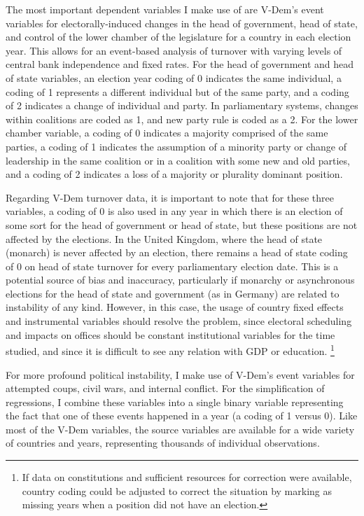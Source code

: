 \documentclass{article}
\begin{document}
    The most important dependent variables I make use of are V-Dem’s event variables for electorally-induced changes in the head of government, head of state, and control of the lower chamber of the legislature for a country in each election year. This allows for an event-based analysis of turnover with varying levels of central bank independence and fixed rates. For the head of government and head of state variables, an election year coding of 0 indicates the same individual, a coding of 1 represents a different individual but of the same party, and a coding of 2 indicates a change of individual and party. In parliamentary systems, changes within coalitions are coded as 1, and new party rule is coded as a 2. For the lower chamber variable, a coding of 0 indicates a majority comprised of the same parties, a coding of 1 indicates the assumption of a minority party or change of leadership in the same coalition or in a coalition with some new and old parties, and a coding of 2 indicates a loss of a majority or plurality dominant position.
    
    Regarding V-Dem turnover data, it is important to note that for these three variables, a coding of 0 is also used in any year in which there is an election of some sort for the head of government or head of state, but these positions are not affected by the elections. In the United Kingdom, where the head of state (monarch) is never affected by an election, there remains a head of state coding of 0 on head of state turnover for every parliamentary election date. This is a potential source of bias and inaccuracy, particularly if monarchy or asynchronous elections for the head of state and government (as in Germany) are related to instability of any kind. However, in this case, the usage of country fixed effects and instrumental variables should resolve the problem, since electoral scheduling and impacts on offices should be constant institutional variables for the time studied, and since it is difficult to see any relation with GDP or education. \footnote{If data on constitutions and sufficient resources for correction were available, country coding could be adjusted to correct the situation by marking as missing years when a position did not have an election.}
    
    For more profound political instability, I make use of V-Dem’s event variables for attempted coups, civil wars, and internal conflict. For the simplification of regressions, I combine these variables into a single binary variable representing the fact that one of these events happened in a year (a coding of 1 versus 0). Like most of the V-Dem variables, the source variables are available for a wide variety of countries and years, representing thousands of individual observations.
    
\end{document}
